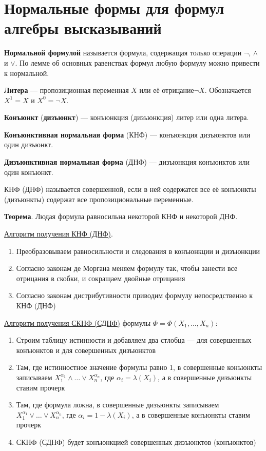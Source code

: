 \section{Нормальные формы для формул алгебры высказываний}
\dftion \textbf{Нормальной формулой} называется формула, содержащая только операции $\lnot$, $\land$ и $\lor$. По лемме об основных равенствах формул любую формулу можно привести к нормальной.

\dftion \textbf{Литера} --- пропозиционная переменная $X$ или её отрицание$\lnot X$. Обозначается $X^1=X$ и $X^0=\lnot X$.

\dftion \textbf{Конъюнкт} (\textbf{дизъюнкт}) --- конъюнкция (дизъюнкция) литер или одна литера.

\dftion \textbf{Конъюнктивная нормальная форма} (КНФ) --- конъюнкция дизъюнктов или один дизъюнкт.


\dftion \textbf{Дизъюнктивная нормальная форма} (ДНФ) --- дизъюнкция конъюнктов или один конъюнкт.

КНФ (ДНФ) называется совершенной, если в ней содержатся все её конъюнкты (дизъюнкты) содержат все пропозициональные переменные.

\textbf{Теорема}. Людая формула равносильна некоторой КНФ и некоторой ДНФ.

\underline{Алгоритм получения КНФ (ДНФ)}.
\begin{enumerate}
    \item Преобразовываем равносильности и следования в конъюнкции и дизъюнкции
    \item Согласно законам де Моргана меняем формулу так, чтобы занести все отрицания в скобки, и сокращаем двойные отрицания
    \item Согласно законам дистрибутивности приводим формулу непосредственно к КНФ (ДНФ)
\end{enumerate}

\underline{Алгоритм получения СКНФ (СДНФ)} формулы $\Phi = \Phi(X_1, \dots, X_n)$:
\begin{enumerate}
    \item Строим таблицу истинности и добавляем два стлобца --- для совершенных конъюнктов и для совершенных дизъюнктов
    \item Там, где истинностное значение формулы равно 1, в совершенные конъюнкты записываем $X_1^{\alpha_1} \land \dots \lor X_n^{\alpha_n}$, где $\alpha_i = \lambda(X_i)$, а в совершенные дизъюнкты ставим прочерк
    \item Там, где формула ложна, в совершенные дизъюнкты записываем $X_1^{\alpha_1} \lor \dots \lor X_n^{\alpha_n}$, где $\alpha_i = 1-\lambda(X_i)$, а в совершенные конъюнкты ставим прочерк
    \item СКНФ (СДНФ) будет конъюнкцией совершенных дизъюнктов (конъюнктов)
\end{enumerate}